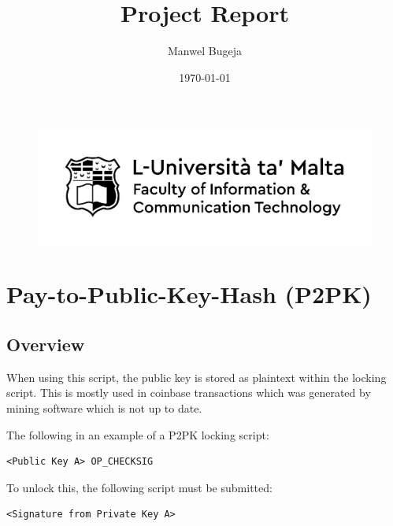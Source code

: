 \documentclass[a4paper, 12pt]{article}
\begin{document}
\begin{figure}
    \centering
    \includegraphics[width=1\textwidth]{Logo}
\end{figure}

\title{Project Report}
\author{Manwel Bugeja}
\date{\today}
\maketitle
  
\tableofcontents
\newpage


\section{Pay-to-Public-Key-Hash (P2PK)} %
\label{sec:pay_to_pubkey_p2pk}

\subsection{Overview} %
\label{sub:overview}

When using this script, the public key is stored as plaintext within the locking script. This is mostly used in coinbase transactions which was generated by mining software which is not up to date.
\par

The following in an example of a P2PK locking script:

\begin{lstlisting}[basicstyle=\ttfamily]
<Public Key A> OP_CHECKSIG
\end{lstlisting}

To unlock this, the following script must be submitted:
\begin{lstlisting}[basicstyle=\ttfamily]
<Signature from Private Key A>
\end{lstlisting}
\end{document}
